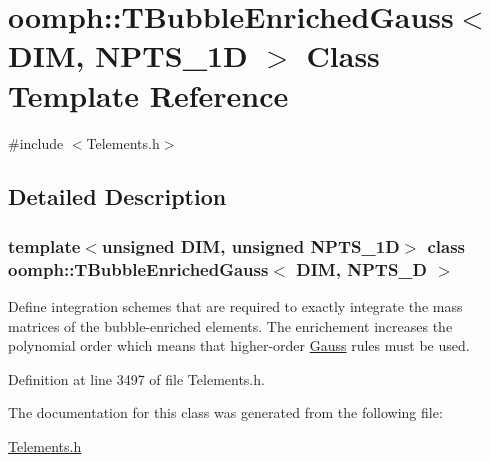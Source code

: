 \hypertarget{classoomph_1_1TBubbleEnrichedGauss}{}\section{oomph\+:\+:T\+Bubble\+Enriched\+Gauss$<$ D\+IM, N\+P\+T\+S\+\_\+1D $>$ Class Template Reference}
\label{classoomph_1_1TBubbleEnrichedGauss}


{\ttfamily \#include $<$Telements.\+h$>$}



\subsection{Detailed Description}
\subsubsection*{template$<$unsigned D\+IM, unsigned N\+P\+T\+S\+\_\+1D$>$\newline
class oomph\+::\+T\+Bubble\+Enriched\+Gauss$<$ D\+I\+M, N\+P\+T\+S\+\_\+D $>$}

Define integration schemes that are required to exactly integrate the mass matrices of the bubble-\/enriched elements. The enrichement increases the polynomial order which means that higher-\/order \hyperlink{classoomph_1_1Gauss}{Gauss} rules must be used. 

Definition at line 3497 of file Telements.\+h.



The documentation for this class was generated from the following file\+:\begin{DoxyCompactItemize}
\item 
\hyperlink{Telements_8h}{Telements.\+h}\end{DoxyCompactItemize}
